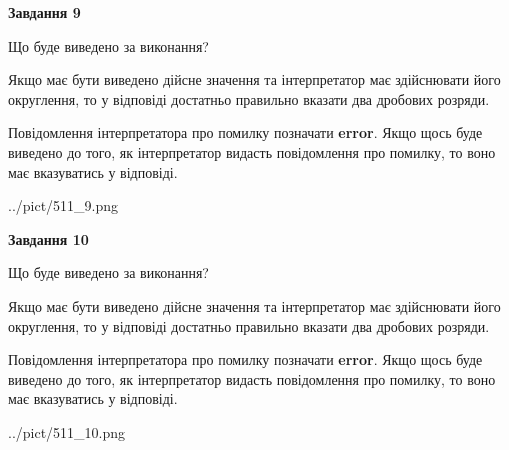 \documentclass[12pt, ukrainian]{article}
\begin{document}
{\begin {Large}
{\begin {center}\textbf{Завдання 9}\end {center}}\par
Що буде виведено за виконання? \par

Якщо має бути виведено дійсне значення та інтерпретатор має здійснювати його округлення, 
то у відповіді достатньо правильно вказати два дробових розряди.

Повідомлення інтерпретатора про помилку позначати \textbf{error}.
Якщо щось буде виведено до того, як інтерпретатор видасть повідомлення про помилку, 
то воно має вказуватись у відповіді. \par

\begin{center}
	{../pict/511_9.png}
\end{center}
\newpage

{\begin {center}\textbf{Завдання 10}\end {center}}\par
Що буде виведено за виконання? \par

Якщо має бути виведено дійсне значення та інтерпретатор має здійснювати його округлення, 
то у відповіді достатньо правильно вказати два дробових розряди.

Повідомлення інтерпретатора про помилку позначати \textbf{error}.
Якщо щось буде виведено до того, як інтерпретатор видасть повідомлення про помилку, 
то воно має вказуватись у відповіді. \par

\begin{center}
	{../pict/511_10.png}
\end{center}
\newpage

\end {Large}}
\end{document}
